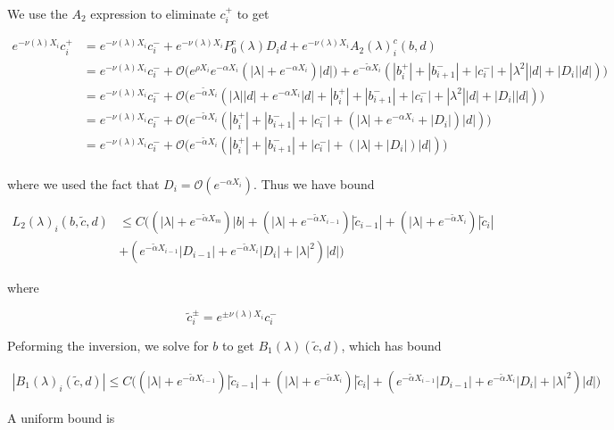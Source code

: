 \documentclass[12pt]{article}
\begin{document}
We use the $A_2$ expression to eliminate $c_i^+$ to get

\begin{align*}
e^{-\nu(\lambda)X_i} c_i^+ &= e^{-\nu(\lambda)X_i} c_i^- 
+ e^{-\nu(\lambda)X_i} P_0^c(\lambda) D_i d + e^{-\nu(\lambda)X_i} A_2(\lambda)_i^c(b, d)\\
&= e^{-\nu(\lambda)X_i} c_i^- + \mathcal{O}\Big( e^{\rho X_i} e^{-\alpha X_i} ( |\lambda| + e^{-\alpha X_i} ) |d|) + e^{-\tilde{\alpha} X_i}( |b_i^+| + |b_{i+1}^-| + |c_i^-| + |\lambda^2||d| + |D_i||d|) \Big) \\
&= e^{-\nu(\lambda)X_i} c_i^- + \mathcal{O}\Big( e^{-\tilde{\alpha} X_i} ( |\lambda||d| + e^{-\alpha X_i} |d| + |b_i^+| + |b_{i+1}^-| + |c_i^-| + |\lambda^2||d| + |D_i||d|) \Big) \\
&= e^{-\nu(\lambda)X_i} c_i^- + \mathcal{O}\Big( e^{-\tilde{\alpha} X_i} ( |b_i^+| + |b_{i+1}^-| + |c_i^-| + (|\lambda| + e^{-\alpha X_i} + |D_i| ) |d|) \Big) \\
&= e^{-\nu(\lambda)X_i} c_i^- + \mathcal{O}\Big( e^{-\tilde{\alpha} X_i} ( |b_i^+| + |b_{i+1}^-| + |c_i^-| + (|\lambda| + |D_i| ) |d|) \Big) \\
\end{align*}

where we used the fact that $D_i = \mathcal{O}(e^{-\alpha X_i})$. Thus we have bound

\begin{align*}
L_2(\lambda)_i(b, \tilde{c}, d) &\leq 
C\Big( (|\lambda| + e^{-\tilde{\alpha}X_m})|b| 
+ (|\lambda| + e^{-\tilde{\alpha}X_{i-1}})|\tilde{c}_{i-1}|
+ (|\lambda| + e^{-\tilde{\alpha}X_i})|\tilde{c}_i| \\
&+ (e^{-\tilde{\alpha}X_{i-1}}|D_{i-1}| + e^{-\tilde{\alpha}X_i}|D_i| 
+ |\lambda|^2)|d| \Big)
\end{align*}

where

\[
\tilde{c}_i^\pm = e^{\pm \nu(\lambda) X_i} c_i^-
\]

Peforming the inversion, we solve for $b$ to get $B_1(\lambda)(\tilde{c}, d)$, which has bound

\begin{align*}
|B_1(\lambda)_i(\tilde{c}, d)| \leq C \Big(
(|\lambda| + e^{-\tilde{\alpha}X_{i-1}})|\tilde{c}_{i-1}|
+ (|\lambda| + e^{-\tilde{\alpha}X_i})|\tilde{c}_i|
+ (e^{-\tilde{\alpha}X_{i-1}}|D_{i-1}| + e^{-\tilde{\alpha}X_i}|D_i| 
+ |\lambda|^2)|d|
\Big)
\end{align*}

A uniform bound is
\end{document}
